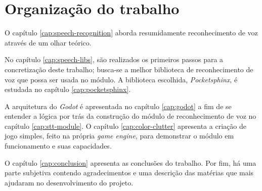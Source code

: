 
\section{Organização do trabalho}

O capítulo \ref{cap:speech-recognition} aborda resumidamente reconhecimento de voz através de um olhar teórico.\iffalse A seguir, no capítulo \ref{cap:hmm}, apresenta-se uma forma de realizar reconhecimento de voz por meio do \textit{Modelo Oculto de Markov}.\fi

No capítulo \ref{cap:speech-libs}, são realizados os primeiros passos para a concretização deste trabalho; busca-se a melhor biblioteca de reconhecimento de voz que possa ser usada no módulo. A biblioteca escolhida, \textit{Pocketsphinx}, é estudada no capítulo \ref{cap:pocketsphinx}.

A arquitetura do \textit{Godot} é apresentada no capítulo \ref{cap:godot} a fim de se entender a lógica por trás da construção do módulo de reconhecimento de voz no capítulo \ref{cap:stt-module}. O capítulo \ref{cap:color-clutter} apresenta a criação de jogo simples, feito na própria \textit{game engine}, para demonstrar o módulo em funcionamento e suas capacidades.

O capítulo \ref{cap:conclusion} apresenta as conclusões do trabalho. Por fim, há uma parte subjetiva contendo agradecimentos e uma descrição das matérias que mais ajudaram no desenvolvimento do projeto.
